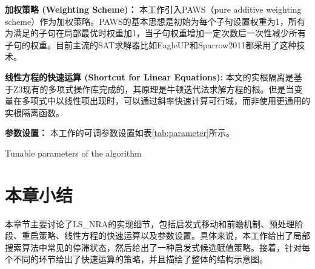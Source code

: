 \textbf{加权策略 (Weighting Scheme)：} 本工作引入PAWS（pure additive weighting scheme）\cite{PAWS}作为加权策略。PAWS的基本思想是初始为每个子句设置权重为1，所有为满足的子句在局部最优时权重加1，当子句权重增加一定次数后一次性减少所有子句的权重。目前主流的SAT求解器比如EagleUP\cite{eagleup}和Sparrow2011\cite{sparrow}都采用了这种技术。

\textbf{线性方程的快速运算 (Shortcut for Linear Equations):} 本文的实根隔离是基于Z3现有的多项式操作库完成的，其原理是牛顿迭代法求解方程的根。但是当变量在多项式中以线性项出现时，可以通过斜率快速计算可行域，而非使用更通用的实根隔离函数。

\textbf{参数设置：} 本工作的可调参数设置如表\ref{tab:parameter}所示。

\begin{table}[]
    \centering
     {Tunable parameters of the algorithm}
\label{tab:parameter}
\end{table}

\section{本章小结}
本章节主要讨论了LS\_NRA的实现细节，包括启发式移动和前瞻机制、预处理阶段、重启策略、线性方程的快速运算以及参数设置。具体来说，本工作给出了局部搜索算法中常见的停滞状态，然后给出了一种启发式候选赋值策略。接着，针对每个不同的环节给出了快速运算的策略，并且描绘了整体的结构示意图。